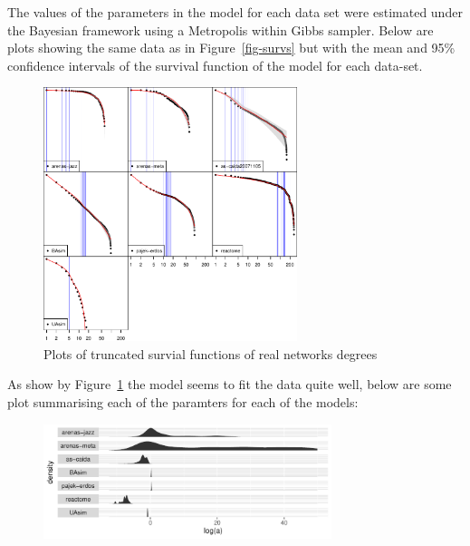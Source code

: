 \documentclass[
  10pt,
  a4paper,
]{scrreprt}
\theoremstyle{plain}
\theoremstyle{plain}
\theoremstyle{definition}
\theoremstyle{plain}
\theoremstyle{remark}
\begin{document}
{The values of the parameters in the model for each data set were
estimated under the Bayesian framework using a Metropolis within Gibbs
sampler. Below are plots showing the same data as in
Figure~\ref{fig-survs} but with the mean and 95\% confidence intervals
of the survival function of the model for each data-set.

\begin{figure}[H]

{\centering \includegraphics[width=0.66\textwidth,height=\textheight]{doc_files/figure-pdf/fig-fits1-1.pdf}

}

\caption{\label{fig-fits1}Plots of truncated survial functions of real
networks degrees}

\end{figure}

As show by Figure~\ref{fig-fits1} the model seems to fit the data quite
well, below are some plot summarising each of the paramters for each of
the models:

\begin{figure}[H]

{\centering \includegraphics[width=0.75\textwidth,height=\textheight]{doc_files/figure-pdf/fig-alpha-1.pdf}

}


\end{figure}}
\end{document}
